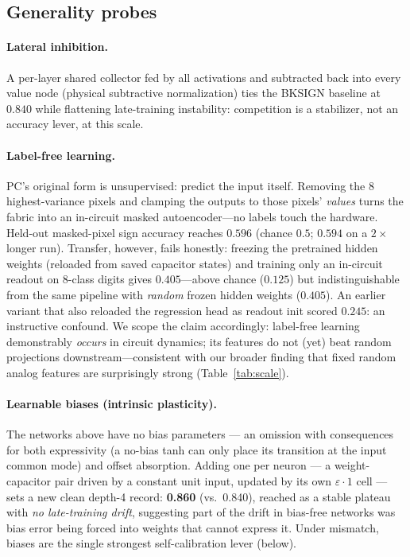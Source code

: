 \documentclass[11pt]{article}
\newcommand{\eps}{\varepsilon}
\begin{document}
\subsection{Generality probes}

\paragraph{Lateral inhibition.} A per-layer shared collector fed by all activations and subtracted back into every value node (physical subtractive normalization) ties the BKSIGN baseline at $0.840$ while flattening late-training instability: competition is a stabilizer, not an accuracy lever, at this scale.

\paragraph{Label-free learning.} PC's original form \cite{rao1999} is unsupervised: predict the input itself. Removing the 8 highest-variance pixels and clamping the outputs to those pixels' \emph{values} turns the fabric into an in-circuit masked autoencoder---no labels touch the hardware. Held-out masked-pixel sign accuracy reaches $0.596$ (chance $0.5$; $0.594$ on a $2\times$ longer run). Transfer, however, fails honestly: freezing the pretrained hidden weights (reloaded from saved capacitor states) and training only an in-circuit readout on 8-class digits gives $0.405$---above chance ($0.125$) but indistinguishable from the same pipeline with \emph{random} frozen hidden weights ($0.405$). An earlier variant that also reloaded the regression head as readout init scored $0.245$: an instructive confound. We scope the claim accordingly: label-free learning demonstrably \emph{occurs} in circuit dynamics; its features do not (yet) beat random projections downstream---consistent with our broader finding that fixed random analog features are surprisingly strong (Table~\ref{tab:scale}).

\paragraph{Learnable biases (intrinsic plasticity).} The networks above have no bias parameters --- an omission with consequences for both expressivity (a no-bias tanh can only place its transition at the input common mode) and offset absorption. Adding one per neuron --- a weight-capacitor pair driven by a constant unit input, updated by its own $\eps\cdot 1$ cell --- sets a new clean depth-4 record: \textbf{0.860} (vs.\ 0.840), reached as a stable plateau with \emph{no late-training drift}, suggesting part of the drift in bias-free networks was bias error being forced into weights that cannot express it. Under mismatch, biases are the single strongest self-calibration lever (below).
\end{document}
